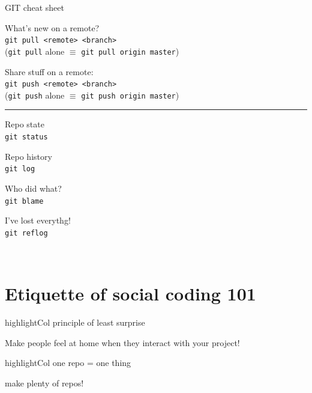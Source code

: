 \documentclass[compress]{beamer}
\newcommand{\highlight}[1]{%
    \vspace{1em}%
    \begin{beamercolorbox}[wd=\linewidth,ht=2ex,dp=0.7ex]{highlightCol}%
    \centering #1%
    \end{beamercolorbox}%
    \vspace{1em}%
}%
\begin{document}
\begin{frame}{GIT cheat sheet}
\begin{multicols}{2}
    {\Medium What's new on a remote?}\\
    \texttt{git pull <remote> <branch>}\\
    {\tiny (\texttt{git pull} alone $\equiv$ \texttt{git pull origin master})}\par

    {\Medium Share stuff on a remote:}\\
    \texttt{git push <remote> <branch>}\\
    {\tiny (\texttt{git push} alone $\equiv$ \texttt{git push origin master})}\par

    \rule{\columnwidth}{0.2pt}

    \begin{multicols}{2}
    {\Medium Repo state}\\
    \texttt{git status}\par

    {\Medium Repo history}\\
    \texttt{git log}\par

    {\Medium Who did what?}\\
    \texttt{git blame}\par

    {\Medium I've lost everythg!}\\
    \texttt{git reflog}\par


    \end{multicols}

    ~\\

    \end{multicols}

\end{frame}

\section{Etiquette of social coding 101}

\begin{frame}{}
    \centering

    \highlight{\Medium principle of least surprise}

    Make people feel at home when they interact with your project!

\end{frame}

\begin{frame}{}
    \centering
    \highlight{one repo = one thing}

    make plenty of repos!
\end{frame}
\end{document}
